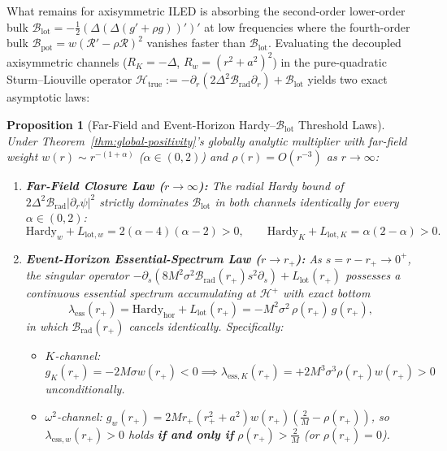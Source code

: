 \documentclass[11pt, a4paper]{article}
\newtheorem{proposition}[theorem]{Proposition}
\theoremstyle{remark}
\begin{document}
What remains for axisymmetric ILED is absorbing the second-order lower-order bulk $\mathcal{B}_{\mathrm{lot}} = -\frac{1}{2}(\Delta(\Delta(g' + \rho g))')'$ at low frequencies where the fourth-order bulk $\mathcal{B}_{\mathrm{pot}} = w(\mathcal{R}' - \rho\mathcal{R})^2$ vanishes faster than $\mathcal{B}_{\mathrm{lot}}$. Evaluating the decoupled axisymmetric channels ($R_K = -\Delta$, $R_w = (r^2 + a^2)^2$) in the pure-quadratic Sturm--Liouville operator $\mathcal{H}_{\mathrm{true}} := -\partial_r(2\Delta^2\mathcal{B}_{\mathrm{rad}}\partial_r) + \mathcal{B}_{\mathrm{lot}}$ yields two exact asymptotic laws:

\begin{proposition}[Far-Field and Event-Horizon Hardy--$\mathcal{B}_{\mathrm{lot}}$ Threshold Laws]
\label{prop:hardy-laws}
Under Theorem~\ref{thm:global-positivity}'s globally analytic multiplier with far-field weight $w(r) \sim r^{-(1+\alpha)}$ ($\alpha \in (0, 2)$) and $\rho(r) = O(r^{-3})$ as $r \to \infty$:
\begin{enumerate}
\item \textbf{Far-Field Closure Law ($r \to \infty$):} The radial Hardy bound of $2\Delta^2\mathcal{B}_{\mathrm{rad}}|\partial_r\psi|^2$ strictly dominates $\mathcal{B}_{\mathrm{lot}}$ in both channels identically for every $\alpha \in (0, 2)$:
\begin{equation}
\mathrm{Hardy}_w + L_{\mathrm{lot}, w} = 2(\alpha - 4)(\alpha - 2) > 0, \qquad \mathrm{Hardy}_K + L_{\mathrm{lot}, K} = \alpha(2 - \alpha) > 0.
\end{equation}
\item \textbf{Event-Horizon Essential-Spectrum Law ($r \to r_+$):} As $s = r - r_+ \to 0^+$, the singular operator $-\partial_s(8M^2\sigma^2\mathcal{B}_{\mathrm{rad}}(r_+) s^2 \partial_s) + L_{\mathrm{lot}}(r_+)$ possesses a continuous essential spectrum accumulating at $\mathcal{H}^+$ with exact bottom
\begin{equation}
\label{eq:lambda-ess}
\lambda_{\mathrm{ess}}(r_+) = \mathrm{Hardy}_{\mathrm{hor}} + L_{\mathrm{lot}}(r_+) = -M^2\sigma^2\,\rho(r_+)\,g(r_+),
\end{equation}
in which $\mathcal{B}_{\mathrm{rad}}(r_+)$ cancels identically. Specifically:
\begin{itemize}
\item \emph{$K$-channel:} $g_K(r_+) = -2M\sigma w(r_+) < 0 \implies \lambda_{\mathrm{ess}, K}(r_+) = +2M^3\sigma^3\rho(r_+)w(r_+) > 0$ unconditionally.
\item \emph{$\omega^2$-channel:} $g_w(r_+) = 2Mr_+(r_+^2 + a^2)w(r_+)\!\left(\frac{2}{M} - \rho(r_+)\right)$, so $\lambda_{\mathrm{ess}, w}(r_+) > 0$ holds \textbf{if and only if} $\rho(r_+) > \frac{2}{M}$ (or $\rho(r_+) = 0$).
\end{itemize}
\end{enumerate}
\end{proposition}
\end{document}
